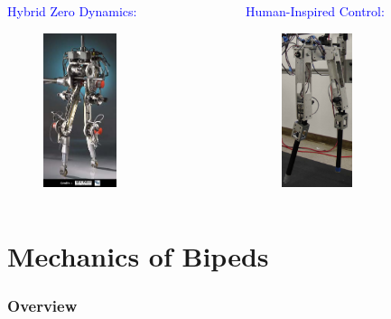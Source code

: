 \documentclass{beamer}
\begin{document}
\begin{frame}
\begin{columns}[T]
    \begin{column}{.24\textwidth}
      \textcolor{blue}{Hybrid Zero Dynamics:}
      \begin{figure}
        \centering
        \includegraphics[height=4.5cm]{figures/bipeds_grizzle}
      \end{figure}
    \end{column}

    \begin{column}{.24\textwidth}
      \textcolor{blue}{Human-Inspired Control:}
      \begin{figure}
        \centering
        \includegraphics[height=4.5cm]{figures/bipeds_ames}
      \end{figure}
    \end{column}

  \end{columns}
\end{frame}

\section{Mechanics of Bipeds}
\begin{frame}
  \frametitle{Overview}
  \tableofcontents[sectionstyle=show/shaded,subsectionstyle=hide]
\end{frame}
\end{document}

